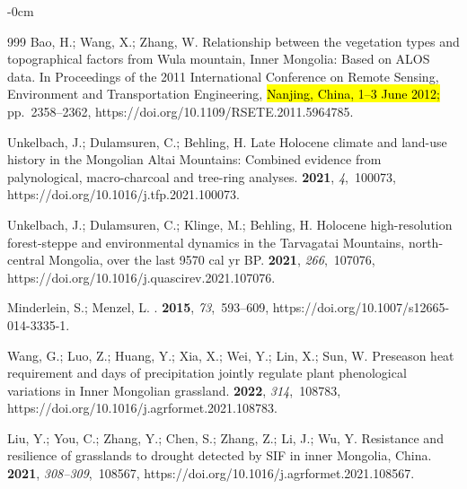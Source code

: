 \documentclass[geosciences,article,accept,pdftex,oneauthor]{Definitions/mdpi}
\begin{document}
\begin{adjustwidth}{-\extralength}{0cm}
\begin{thebibliography}{999}
Bao, H.; Wang, X.; Zhang, W.
\newblock Relationship between the vegetation types and topographical factors
  from Wula mountain, Inner Mongolia: Based on ALOS data.
\newblock In Proceedings of the 2011 International Conference on Remote
  Sensing, Environment and Transportation Engineering, \hl{Nanjing, China, 1--3 June 2012;} %
  pp.~2358--2362, https://doi.org/10.1109/RSETE.2011.5964785.

Unkelbach, J.; Dulamsuren, C.; Behling, H.
\newblock Late Holocene climate and land-use history in the Mongolian Altai
  Mountains: Combined evidence from palynological, macro-charcoal and tree-ring
  analyses.
 {\bf 2021}, {\em 4},~100073, https://doi.org/10.1016/j.tfp.2021.100073.

Unkelbach, J.; Dulamsuren, C.; Klinge, M.; Behling, H.
\newblock Holocene high-resolution forest-steppe and environmental dynamics in
  the Tarvagatai Mountains, north-central Mongolia, over the last 9570 cal yr
  BP.
 {\bf 2021}, {\em 266},~107076, https://doi.org/10.1016/j.quascirev.2021.107076.

Minderlein, S.; Menzel, L.
.
 {\bf 2015}, {\em 73},~593--609, https://doi.org/10.1007/s12665-014-3335-1.

Wang, G.; Luo, Z.; Huang, Y.; Xia, X.; Wei, Y.; Lin, X.; Sun, W.
\newblock Preseason heat requirement and days of precipitation jointly regulate
  plant phenological variations in Inner Mongolian grassland.
 {\bf 2022}, {\em
  314},~108783, https://doi.org/10.1016/j.agrformet.2021.108783.

Liu, Y.; You, C.; Zhang, Y.; Chen, S.; Zhang, Z.; Li, J.; Wu, Y.
\newblock Resistance and resilience of grasslands to drought detected by SIF in
  inner Mongolia, China.
 {\bf 2021}, {\em
  308--309},~108567, https://doi.org/10.1016/j.agrformet.2021.108567.


\end{thebibliography}
\end{adjustwidth}
\end{document}
